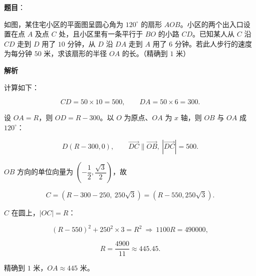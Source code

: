 \begin{answer}

\textbf{题目}：

如图，某住宅小区的平面图呈圆心角为 $120^\circ$ 的扇形 $AOB$。小区的两个出入口设置在点 $A$ 及点 $C$ 处，且小区里有一条平行于 $BO$ 的小路 $CD$。已知某人从 $C$ 沿 $CD$ 走到 $D$ 用了 $10$ 分钟，从 $D$ 沿 $DA$ 走到 $A$ 用了 $6$ 分钟。若此人步行的速度为每分钟 $50$ 米，求该扇形的半径 $OA$ 的长。（精确到 $1$ 米）
\nopagebreak[4]
\begin{center}\end{center}
\nopagebreak[4]
\textbf{解析}

计算如下：

\nopagebreak[4]
\[CD=50\times10=500,\qquad DA=50\times6=300.\]

设 $OA=R$，则 $OD=R-300$。以 $O$ 为原点、$OA$ 为 $x$ 轴，则 $OB$ 与 $OA$ 成 $120^\circ$：

\nopagebreak[4]
\[D(R-300,0),\qquad \overrightarrow{DC}\parallel\overrightarrow{OB},\ |\overrightarrow{DC}|=500.\]

$OB$ 方向的单位向量为 $\left(-\dfrac12,\dfrac{\sqrt3}2\right)$，故

\nopagebreak[4]
\[C=\left(R-300-250,\ 250\sqrt3\right)=(R-550,250\sqrt3).\]

$C$ 在圆上，$|OC|=R$：

\nopagebreak[4]
\[(R-550)^2+250^2\times3=R^2\ \Longrightarrow\ 1100R=490000,\]

\nopagebreak[4]
\[R=\frac{4900}{11}\approx445.45.\]

精确到 $1$ 米，$OA\approx445$ 米。


\end{answer}
